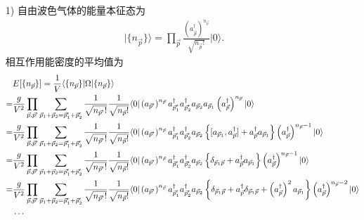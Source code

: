 \documentclass{assignment}
\begin{document}
\begin{pf}
    \begin{itemize}
        \item[1)] 自由波色气体的能量本征态为
        \begin{align}
            \lvert\{n_{\vec{p}}\}\rangle=\prod_{\vec{p}}\frac{\left(a_{\vec{p}}^{\dagger}\right)^{n_{\vec{p}}}}{\sqrt{n_{\vec{p}}!}}\lvert 0\rangle.
        \end{align}
        相互作用能密度的平均值为
        {\small
        \begin{align}
            \notag&E[\{n_{\vec{p}}\}]=\frac{1}{V}\langle\{n_{\vec{p}}\}\rvert\Omega\lvert\{n_{\vec{p}}\}\rangle\\
            \notag=&\frac{g}{V^2}\prod_{\vec{p},\vec{p}'}\sum_{\vec{p}_1+\vec{p}_2=\vec{p}_1'+\vec{p}_2'}\frac{1}{\sqrt{n_{\vec{p}'}!}}\frac{1}{\sqrt{n_{\vec{p}}!}}\langle 0\rvert \left(a_{\vec{p}'}\right)^{n_{\vec{p}}}a_{\vec{p}_1'}^{\dagger}a_{\vec{p}_2'}^{\dagger}a_{\vec{p}_2}a_{\vec{p}_1}\left(a_{\vec{p}}^{\dagger}\right)^{n_{\vec{p}}}\lvert 0\rangle\\
            \notag=&\frac{g}{V^2}\prod_{\vec{p},\vec{p}'}\sum_{\vec{p}_1+\vec{p}_2=\vec{p}_1'+\vec{p}_2'}\frac{1}{\sqrt{n_{\vec{p}'}!}}\frac{1}{\sqrt{n_{\vec{p}}!}}\langle 0\rvert \left(a_{\vec{p}'}\right)^{n_{\vec{p}}}a_{\vec{p}_1'}^{\dagger}a_{\vec{p}_2'}^{\dagger}a_{\vec{p}_2}\left\{[a_{\vec{p}_1},a_{\vec{p}}^{\dagger}]+a_{\vec{p}}^{\dagger}a_{\vec{p}_1}\right\}\left(a_{\vec{p}}^{\dagger}\right)^{n_{\vec{p}}-1}\lvert 0\rangle\\
            \notag=&\frac{g}{V^2}\prod_{\vec{p},\vec{p}'}\sum_{\vec{p}_1+\vec{p}_2=\vec{p}_1'+\vec{p}_2'}\frac{1}{\sqrt{n_{\vec{p}'}!}}\frac{1}{\sqrt{n_{\vec{p}}!}}\langle 0\rvert \left(a_{\vec{p}'}\right)^{n_{\vec{p}}}a_{\vec{p}_1'}^{\dagger}a_{\vec{p}_2'}^{\dagger}a_{\vec{p}_2}\left\{\delta_{\vec{p}_1\vec{p}}+a_{\vec{p}}^{\dagger}a_{\vec{p}_1}\right\}\left(a_{\vec{p}}^{\dagger}\right)^{n_{\vec{p}}-1}\lvert 0\rangle\\
            \notag=&\frac{g}{V^2}\prod_{\vec{p},\vec{p}'}\sum_{\vec{p}_1+\vec{p}_2=\vec{p}_1'+\vec{p}_2'}\frac{1}{\sqrt{n_{\vec{p}'}!}}\frac{1}{\sqrt{n_{\vec{p}}!}}\langle 0\rvert \left(a_{\vec{p}'}\right)^{n_{\vec{p}}}a_{\vec{p}_1'}^{\dagger}a_{\vec{p}_2'}^{\dagger}a_{\vec{p}_2}\left\{\delta_{\vec{p}_1\vec{p}}+a_{\vec{p}}^{\dagger}\delta_{\vec{p}_1\vec{p}}+\left(a_{\vec{p}}^{\dagger}\right)^2a_{\vec{p}_1}\right\}\left(a_{\vec{p}}^{\dagger}\right)^{n_{\vec{p}}-2}\lvert 0\rangle\\
            \notag&\cdots\\

\end{align}}
\end{itemize}
\end{pf}
\end{document}
